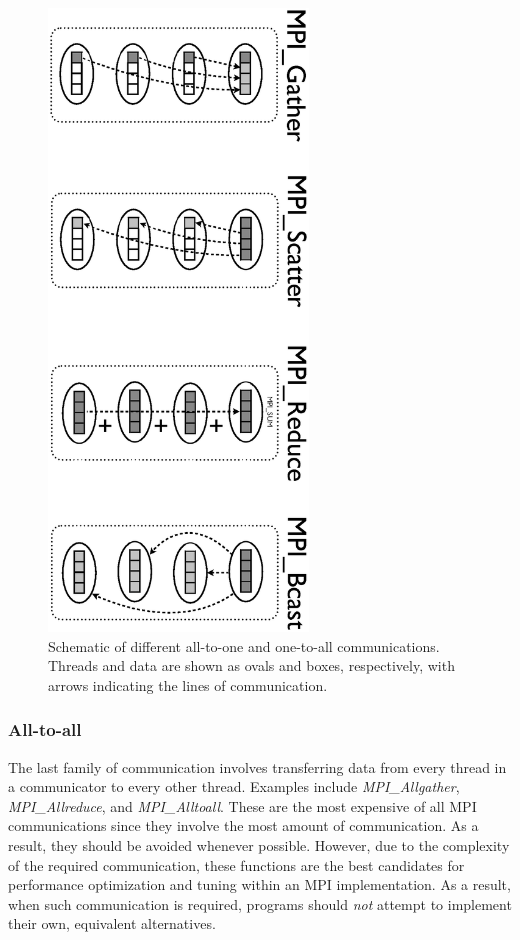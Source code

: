 \begin{figure}
   \includegraphics[height=6.5in, angle=90]{AllToPoint.ps}
   \caption{Schematic of different all-to-one and one-to-all communications.
            Threads and data are shown as ovals and boxes, respectively, with
            arrows indicating the lines of communication.}
   \label{figC:AllToPoint}
\end{figure}

\subsubsection{All-to-all}

The last family of communication involves transferring data from every thread in
a communicator to every other thread. Examples include \emph{MPI\_Allgather},
\emph{MPI\_Allreduce}, and \emph{MPI\_Alltoall}. These are the most expensive of
all MPI communications since they involve the most amount of communication. As a
result, they should be avoided whenever possible. However, due to the complexity
of the required communication, these functions are the best candidates for
performance optimization and tuning within an MPI implementation. As a result,
when such communication is required, programs should \emph{not} attempt to
implement their own, equivalent alternatives.

